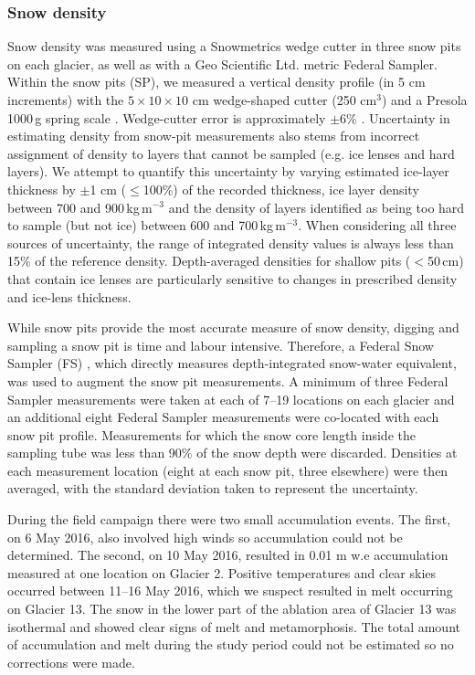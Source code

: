 \documentclass[review,oneside, letterpaper]{igs}
\begin{document}
\subsubsection{Snow density}

Snow density was measured using a Snowmetrics wedge cutter in three snow pits on each glacier, as well as with a Geo Scientific Ltd. metric Federal Sampler. Within the snow pits (SP), we measured a vertical density profile (in 5 cm increments) with the $5\times10\times 10$ cm wedge-shaped cutter (250 cm$^3$) and a Presola 1000\,g spring scale \citep[e.g.][]{Gray1981,Fierz2009}. Wedge-cutter error is approximately $\pm$6\% \citep[e.g.][]{Proksch2016,Carroll1977}. Uncertainty in estimating density from snow-pit measurements also stems  from incorrect assignment of density to layers that cannot be sampled (e.g. ice lenses and hard layers). We attempt to quantify this uncertainty by varying estimated ice-layer thickness by $\pm$1 cm ($\leq$100\%) of the recorded thickness, ice layer density between 700 and 900\,kg\,m$^{-3}$ and the density of layers identified as being too hard to sample (but not ice) between 600 and 700\,kg\,m$^{-3}$. When considering all three sources of uncertainty, the range of integrated density values is always less than 15\% of the reference density. Depth-averaged densities for shallow pits ($<$50\,cm) that contain ice lenses are particularly sensitive to changes in prescribed density and ice-lens thickness. 

While snow pits provide the most accurate measure of snow density, digging and sampling a snow pit is time and labour intensive. Therefore, a Federal Snow Sampler (FS) \citep{Clyde1932}, which directly measures depth-integrated snow-water equivalent, was used to augment the snow pit measurements. A minimum of three Federal Sampler measurements were taken at each of 7--19 locations on each glacier and an additional eight Federal Sampler measurements were co-located with each snow pit profile. Measurements for which the snow core length inside the sampling tube was less than 90\% of the snow depth were discarded. Densities at each measurement location (eight at each snow pit, three elsewhere) were then averaged, with the standard deviation taken to represent the uncertainty.

During the field campaign there were two small accumulation events. The first, on 6 May 2016, also involved high winds so accumulation could not be determined. The second, on 10 May 2016, resulted in 0.01 m w.e accumulation measured at one location on Glacier 2. Positive temperatures and clear skies occurred between 11--16 May 2016, which we suspect resulted in melt occurring on Glacier 13. The snow in the lower part of the ablation area of Glacier 13 was isothermal and showed clear signs of melt and metamorphosis. The total amount of accumulation and melt during the study period could not be estimated so no corrections were made. 
\end{document}
